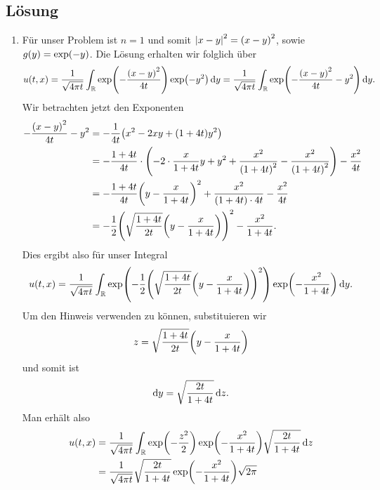 \documentclass{exercise}
\begin{document}
    \subsection*{Lösung}
    \begin{enumerate}
        \item Für unser Problem ist \(n = 1\) und somit \(\absolute*{x - y}^2 = \parentheses*{x - y}^2\), sowie \(g\parentheses*{y} = \exp\parentheses*{-y}\).
        Die Lösung erhalten wir folglich über
        \[
            u\parentheses*{t, x} = \frac{1}{\sqrt{4\pi t}}\int_\R \exp\parentheses*{-\frac{\parentheses*{x - y}^2}{4t}}\exp\parentheses*{-y^2}\d y = \frac{1}{\sqrt{4\pi t}}\int_\R \exp\parentheses*{-\frac{\parentheses*{x - y}^2}{4t} - y^2}\d y.
        \]
        Wir betrachten jetzt den Exponenten
        \begin{align*}
            -\frac{\parentheses*{x - y}^2}{4t} - y^2 &= -\frac{1}{4t}\parentheses*{x^2 - 2xy + \parentheses*{1 + 4t}y^2}\\
            &= -\frac{1 + 4t}{4t} \cdot \parentheses*{-2 \cdot \frac{x}{1 + 4t}y + y^2 + \frac{x^2}{\parentheses*{1 + 4t}^2} - \frac{x^2}{\parentheses*{1 + 4t}^2}} - \frac{x^2}{4t}\\
            &= -\frac{1 + 4t}{4t}\parentheses*{y - \frac{x}{1 + 4t}}^2 + \frac{x^2}{\parentheses*{1 + 4t} \cdot 4t} - \frac{x^2}{4t}\\
            &= -\frac{1}{2}\parentheses*{\sqrt{\frac{1 + 4t}{2t}}\parentheses*{y - \frac{x}{1 + 4t}}}^2 - \frac{x^2}{1 + 4t}.
        \end{align*}
        Dies ergibt also für unser Integral
        \[
            u\parentheses*{t, x} = \frac{1}{\sqrt{4\pi t}}\int_\R \exp\parentheses*{-\frac{1}{2}\parentheses*{\sqrt{\frac{1 + 4t}{2t}}\parentheses*{y - \frac{x}{1 + 4t}}}^2}\exp\parentheses*{-\frac{x^2}{1 + 4t}}\d y.
        \]
        Um den Hinweis verwenden zu können, substituieren wir
        \[
            z = \sqrt{\frac{1 + 4t}{2t}}\parentheses*{y - \frac{x}{1 + 4t}}
        \]
        und somit ist
        \[
            \d y = \sqrt{\frac{2t}{1 + 4t}}\d z.
        \]
        Man erhält also
        \begin{align*}
            u\parentheses*{t, x} &= \frac{1}{\sqrt{4\pi t}}\int_\R \exp\parentheses*{-\frac{z^2}{2}}\exp\parentheses*{-\frac{x^2}{1 + 4t}}\sqrt{\frac{2t}{1 + 4t}}\d z\\
            &= \frac{1}{\sqrt{4\pi t}}\sqrt{\frac{2t}{1 + 4t}}\exp\parentheses*{-\frac{x^2}{1 + 4t}}\sqrt{2\pi}\\

\end{align*}
\end{enumerate}
\end{document}
